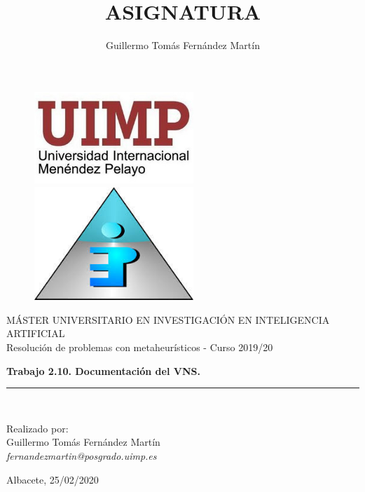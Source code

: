 \documentclass[11pt]{article}
\title{\textbf{ASIGNATURA}}
\author{Guillermo Tomás Fernández Martín}
\begin{document}
\begin{titlepage}

\begin{center}
\vspace*{-1in}
\begin{figure}[htb]
\begin{center}
\includegraphics[width=6cm]{uimp.jpeg}
\includegraphics[width=6cm]{aepia.jpg}
\end{center}
\end{figure}
\vspace*{1in}

MÁSTER UNIVERSITARIO EN INVESTIGACIÓN EN INTELIGENCIA ARTIFICIAL\\
\vspace*{0.15in}
Resolución de problemas con metaheurísticos - Curso 2019/20\\
\vspace*{0.15in}
\vspace*{0.2in}
\begin{Large}
\textbf{Trabajo 2.10. Documentación del VNS.} \\
\end{Large}
\vspace*{0.3in}

\rule{80mm}{0.1mm}\\
\vspace*{0.1in}
\vspace*{0.3in}
\begin{large}
Realizado por:\\ Guillermo Tomás Fernández Martín\\
\textit{fernandezmartin@posgrado.uimp.es}

\end{large}
\end{center}
\vspace*{1.5in}
\begin{flushright}
Albacete, 25/02/2020
\end{flushright}

\end{titlepage}
\end{document}
